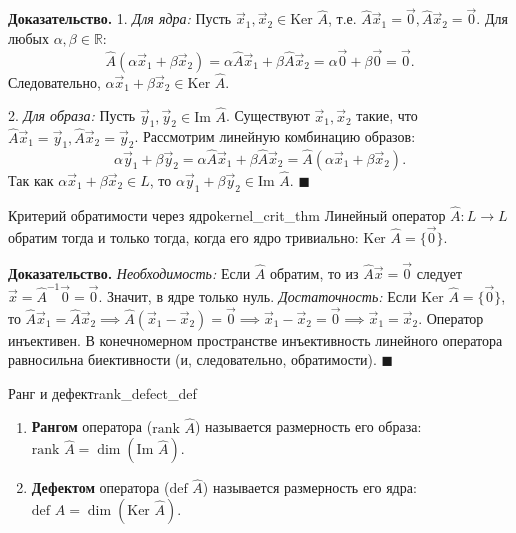 \documentclass[12pt,a4paper]{article}
\newenvironment{myproof}{\noindent\textbf{Доказательство.}}{\hfill$\blacksquare$}
\begin{document}
\begin{myproof}
  1. \textit{Для ядра:} Пусть $\vec{x}_1, \vec{x}_2 \in \text{Ker }
  \hat{A}$, т.е. $\hat{A}\vec{x}_1 = \vec{0}, \hat{A}\vec{x}_2 = \vec{0}$.
  Для любых $\alpha, \beta \in \mathbb{R}$:
  \[
    \hat{A}(\alpha\vec{x}_1 + \beta\vec{x}_2) =
    \alpha\hat{A}\vec{x}_1 + \beta\hat{A}\vec{x}_2 = \alpha\vec{0} +
    \beta\vec{0} = \vec{0}.
  \]
  Следовательно, $\alpha\vec{x}_1 + \beta\vec{x}_2 \in \text{Ker } \hat{A}$.

  2. \textit{Для образа:} Пусть $\vec{y}_1, \vec{y}_2 \in \text{Im }
  \hat{A}$. Существуют $\vec{x}_1, \vec{x}_2$ такие, что
  $\hat{A}\vec{x}_1 = \vec{y}_1, \hat{A}\vec{x}_2 = \vec{y}_2$.
  Рассмотрим линейную комбинацию образов:
  \[
    \alpha\vec{y}_1 + \beta\vec{y}_2 = \alpha\hat{A}\vec{x}_1 +
    \beta\hat{A}\vec{x}_2 = \hat{A}(\alpha\vec{x}_1 + \beta\vec{x}_2).
  \]
  Так как $\alpha\vec{x}_1 + \beta\vec{x}_2 \in L$, то
  $\alpha\vec{y}_1 + \beta\vec{y}_2 \in \text{Im } \hat{A}$.
\end{myproof}

\begin{theorem}{Критерий обратимости через ядро}{kernel_crit_thm}
  Линейный оператор $\hat{A}: L \to L$ обратим тогда и только тогда,
  когда его ядро тривиально: $\text{Ker } \hat{A} = \{\vec{0}\}$.
\end{theorem}

\begin{myproof}
  \textit{Необходимость:} Если $\hat{A}$ обратим, то из
  $\hat{A}\vec{x} = \vec{0}$ следует $\vec{x} = \hat{A}^{-1}\vec{0} =
  \vec{0}$. Значит, в ядре только нуль.
  \textit{Достаточность:} Если $\text{Ker } \hat{A} = \{\vec{0}\}$,
  то $\hat{A}\vec{x}_1 = \hat{A}\vec{x}_2 \implies \hat{A}(\vec{x}_1
  - \vec{x}_2) = \vec{0} \implies \vec{x}_1 - \vec{x}_2 = \vec{0}
  \implies \vec{x}_1 = \vec{x}_2$.
  Оператор инъективен. В конечномерном пространстве инъективность
  линейного оператора равносильна биективности (и, следовательно, обратимости).
\end{myproof}

\begin{definition}{Ранг и дефект}{rank_defect_def}
  \begin{enumerate}
    \item \textbf{Рангом} оператора ($\text{rank } \hat{A}$)
      называется размерность его образа: $\text{rank } \hat{A} =
      \dim(\text{Im } \hat{A})$.
    \item \textbf{Дефектом} оператора ($\text{def } \hat{A}$)
      называется размерность его ядра: $\text{def } \hat{A} =
      \dim(\text{Ker } \hat{A})$.
  \end{enumerate}
\end{definition}
\end{document}
